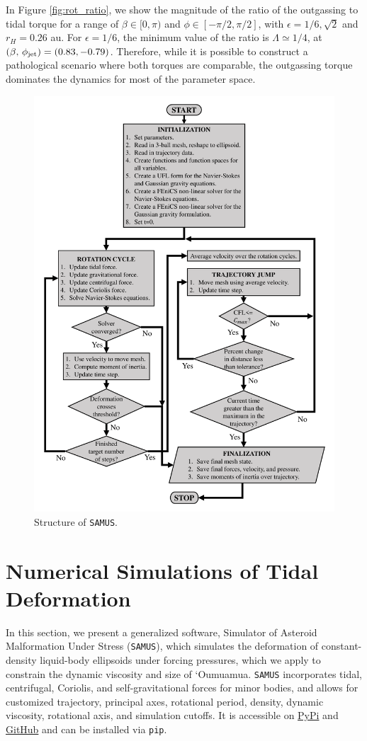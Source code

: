 \documentclass[twocolumn,doublespacing]{aastex631}
\begin{document}
In Figure \ref{fig:rot_ratio}, we show the magnitude of the ratio of the outgassing to tidal torque for a range of $\beta\in[0,\pi)$ and $\phi\in[-\pi/2,\pi/2]$, with $\epsilon=1/6,\sqrt{2}$ and $r_H=0.26$ au. For $\epsilon=1/6$, the minimum value of the ratio is $\Lambda\simeq 1/4$, at $(\beta,\, \phi_{\rm jet})=(0.83,-0.79)$. Therefore, while it is possible to construct a pathological scenario where both torques are comparable, the outgassing torque dominates the dynamics for most of the parameter space. 
\begin{figure}
\centering
\includegraphics[width=.89\textwidth,angle=0]{SAMUSfig.pdf}
\caption{Structure of \texttt{SAMUS}.}
\label{fig:SAMUSstruct}
\end{figure}
 
\section{Numerical Simulations of Tidal Deformation}\label{sec:numerics}

In this section, we present a generalized software, Simulator of Asteroid Malformation Under Stress (\texttt{SAMUS}), which simulates the deformation of constant-density liquid-body ellipsoids under forcing pressures, which we apply to constrain the dynamic viscosity and size of `Oumuamua. \texttt{SAMUS} incorporates tidal, centrifugal, Coriolis, and self-gravitational forces for minor bodies, and allows for customized trajectory, principal axes, rotational period, density, dynamic viscosity, rotational axis, and simulation cutoffs. It is accessible on \href{https://pypi.org/project/SAMUS/1.0.0/}{PyPi} and \href{https://github.com/astertaylor/SAMUS}{GitHub} and can be installed via \texttt{pip}.
 
\end{document}
